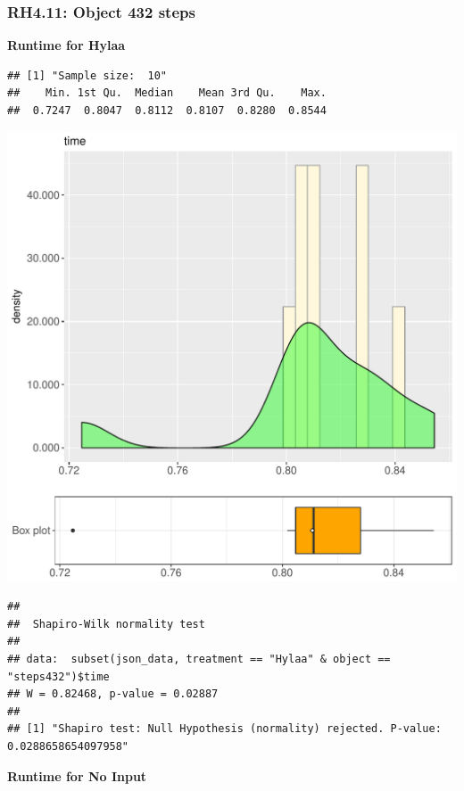 \documentclass{article}\usepackage[]{graphicx}\usepackage[]{color}
\makeatletter
\def\maxwidth{ %
  \ifdim\Gin@nat@width>\linewidth
    \linewidth
  \else
    \Gin@nat@width
  \fi
}
\newenvironment{kframe}{%
 \def\at@end@of@kframe{}%
 \ifinner\ifhmode%
  \def\at@end@of@kframe{\end{minipage}}%
  \begin{minipage}{\columnwidth}%
 \fi\fi%
 \def\FrameCommand##1{\hskip\@totalleftmargin \hskip-\fboxsep
 \colorbox{shadecolor}{##1}\hskip-\fboxsep
     \hskip-\linewidth \hskip-\@totalleftmargin \hskip\columnwidth}%
 \MakeFramed {\advance\hsize-\width
   \@totalleftmargin\z@ \linewidth\hsize
   \@setminipage}}%
 {\par\unskip\endMakeFramed%
 \at@end@of@kframe}
\newenvironment{knitrout}{}{} %
\makeatother
\begin{document}
\subsubsection{RH4.11: Object 432 steps}

 \textbf{Runtime for Hylaa}
\begin{knitrout}
\color{fgcolor}\begin{kframe}
\begin{verbatim}
## [1] "Sample size:  10"
##    Min. 1st Qu.  Median    Mean 3rd Qu.    Max. 
##  0.7247  0.8047  0.8112  0.8107  0.8280  0.8544
\end{verbatim}
\end{kframe}
\includegraphics[width=\maxwidth]{figure/RH4_Hylaa_steps432-1} 
\begin{kframe}\begin{verbatim}
## 
## 	Shapiro-Wilk normality test
## 
## data:  subset(json_data, treatment == "Hylaa" & object == "steps432")$time
## W = 0.82468, p-value = 0.02887
## 
## [1] "Shapiro test: Null Hypothesis (normality) rejected. P-value: 0.0288658654097958"
\end{verbatim}
\end{kframe}
\end{knitrout}
 \textbf{Runtime for No Input}
\end{document}
